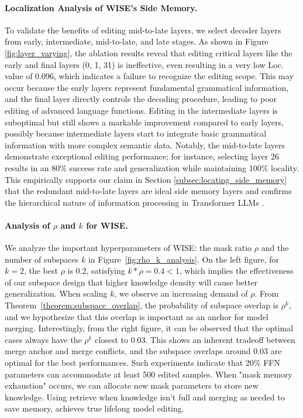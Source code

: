 \documentclass{article}
\begin{document}
\paragraph{Localization Analysis of WISE's Side Memory.}
\label{subsec:layer_selection}
To validate the benefits of editing mid-to-late layers, we select decoder layers from early, intermediate, mid-to-late, and late stages.
As shown in Figure \ref{fig:layer_varying}, the ablation results reveal that editing critical layers like the early and final layers (0, 1, 31) is ineffective, even resulting in a very low Loc. value of 0.096, which indicates a failure to recognize the editing scope.
This may occur because the early layers represent fundamental grammatical information, and the final layer directly controls the decoding procedure, leading to poor editing of advanced language functions.
Editing in the intermediate layers is suboptimal but still shows a markable improvement compared to early layers, possibly because intermediate layers start to integrate basic grammatical information with more complex semantic data.
Notably, the mid-to-late layers demonstrate exceptional editing performance; for instance, selecting layer 26 results in an 80\% success rate and generalization while maintaining 100\% locality.
This empirically supports our claim in Section \ref{subsec:locating_side_memory} that the redundant mid-to-late layers \cite{shortgpt} are ideal side memory layers and confirms the hierarchical nature of information processing in Transformer LLMs \cite{hierarchy_1, hierarchy_2}.

\paragraph{Analysis of $\rho$ and $k$ for WISE.} We analyze the important hyperparameters of WISE: the mask ratio $\rho$ and the number of subspaces $k$ in Figure~\ref{fig:rho_k_analysis}.
On the left figure, for $k=2$, the best $\rho$ is 0.2, satisfying $k*\rho=0.4<1$, which implies the effectiveness of our subspace design that higher knowledge density will cause better generalization. When scaling $k$, we observe an increasing demand of $\rho$. From Theorem~\ref{theorem:subspace_overlap}, the probability of subspace overlap is $\rho^k$, and we hypothesize that this overlap is important as an anchor for model merging. Interestingly, from the right figure, it can be observed that the optimal cases always have the $\rho^k$ closest to 0.03. This shows an inherent tradeoff between merge anchor and merge conflicts, and the subspace overlaps around 0.03 are optimal for the best performances. Such experiments indicate that 20\% FFN parameters can accommodate at least 500 edited samples. When "mask memory exhaustion" occurs, we can allocate new mask parameters to store new knowledge. Using retrieve when knowledge isn't full and merging as needed to save memory, achieves true lifelong model editing.
\end{document}
